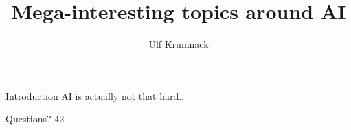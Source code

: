 \documentclass[xcolor=dvipsnames]{beamer}
\begin{document}
\title{{\bf Mega-interesting topics around AI}}
\author{Ulf Krumnack}
\maketitle

\begin{frame}{Introduction}
\pause AI is actually not that hard..
\end{frame}

\begin{frame}{Questions?}
42
\end{frame}
\end{document}
